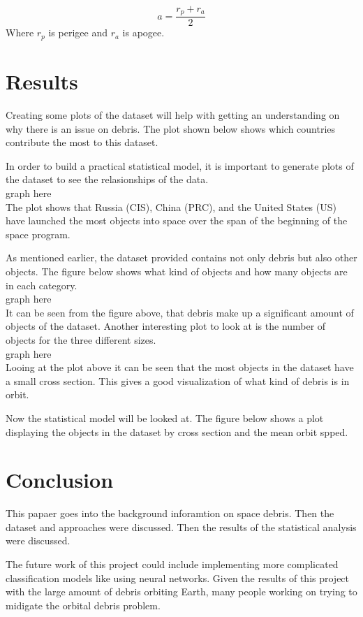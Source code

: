 \documentclass[12pt,a4paper]{article}
\begin{document}
\begin{equation}
a = \frac{r_p + r_a }{2}
\end{equation}
Where $r_p$ is perigee and $r_a$ is apogee.



\section{Results}
Creating some plots of the dataset will help with getting an understanding on why there is an issue on debris. The plot shown below shows which countries contribute the most to this dataset. 

In order to build a practical statistical model, it is important to generate plots of the dataset to see the relasionships of the data.
\\
graph here
\\
The plot shows that Russia (CIS), China (PRC), and the United States (US) have launched the most objects into space over the span of the beginning of the space program. 

As mentioned earlier, the dataset provided contains not only debris but also other objects. The figure below shows what kind of objects and how many objects are in each category.
\\
graph here
\\
It can be seen from the figure above, that debris make up a significant amount of objects of the dataset. Another interesting plot to look at is the number of objects for the three different sizes.
\\
graph here
\\

Looing at the plot above it can be seen that the most objects in the dataset have a small cross section. This gives a good visualization of what kind of debris is in orbit. 

Now the statistical model will be looked at. The figure below shows a plot displaying the objects in the dataset by cross section and the mean orbit spped.  


\section{Conclusion}
This papaer goes into the background inforamtion on space debris. Then the dataset and approaches were discussed. Then the results of the statistical analysis were discussed.

The future work of this project could include implementing more complicated classification models like using neural networks.
Given the results of this project with the large amount of debris orbiting Earth, many people working on trying to midigate the orbital debris problem. 

 
\end{document}
